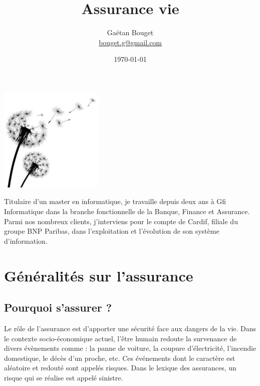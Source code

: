 \documentclass{article}
\title{Assurance vie}
\author{Gaëtan Bouget \\ \href{mailto:bouget.g@gmail.com}{bouget.g@gmail.com}}
\date{\today}
\begin{document}
\maketitle
\thispagestyle{empty}

\vspace{3cm}

\begin{center}
    \includegraphics[width=5cm]{resources/dandelion.jpg}
\end{center}

\vspace{3cm}

Titulaire d'un master en informatique, je travaille depuis deux ans à Gfi Informatique dans la branche fonctionnelle de la Banque, Finance et Assurance. Parmi nos nombreux clients, j'interviens pour le compte de Cardif, filiale du groupe BNP Paribas, dans l'exploitation et l'évolution de son système d'information.

\newpage

\tableofcontents

\newpage

\section{Généralités sur l'assurance}

\subsection{Pourquoi s'assurer ?}
Le rôle de l'assurance est d'apporter une sécurité face aux dangers de la vie. Dans le contexte socio-économique actuel, l'être humain redoute la survenance de divers évènements comme : la panne de voiture, la coupure d'électricité, l'incendie domestique, le décès d'un proche, etc. Ces événements dont le caractère est aléatoire et redouté sont appelés risques. Dans le lexique des assurances, un risque qui se réalise est appelé sinistre.
\end{document}
